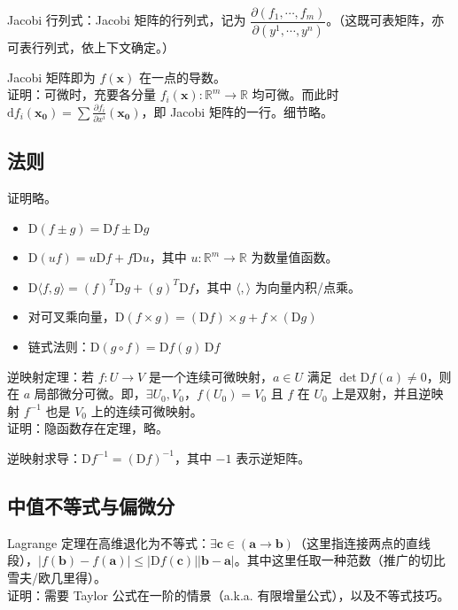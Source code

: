 \documentclass[12pt, a4paper, UTF8, openany]{ctexbook}
\newcommand{\dif}{\mathrm{d}}
\newcommand{\Dif}{\mathrm{D}}
\newcommand{\field}[1]{\mathbb{#1}}%
\newcommand{\mat}[1]{\mathbf{#1}}
\newcommand{\inner}[2]{\langle #1, #2 \rangle}
\begin{document}
        Jacobi 行列式：Jacobi 矩阵的行列式，记为 $\dfrac{\partial (f_1, \cdots, f_m)}{\partial (y^1, \cdots, y^n)}$。（这既可表矩阵，亦可表行列式，依上下文确定。）

        Jacobi 矩阵即为 $f(\mat{x})$ 在一点的导数。\\
        证明：可微时，充要各分量 $f_i(\mat{x}): \field{R}^m \to \field{R}$ 均可微。而此时 $\dif f_i(\mat{x_0}) = \sum \frac{\partial f_i}{\partial x^i}(\mat{x_0})$，即 Jacobi 矩阵的一行。细节略。

        \subsection{法则}
        证明略。
        \begin{itemize}
            \item $\Dif (f \pm g) = \Dif f \pm \Dif g$
            \item $\Dif (u f) = u \Dif f + f\Dif u$，其中 $u: \field{R}^m \to \field{R}$ 为数量值函数。
            \item $\Dif \inner{f}{g} = (f)^T\Dif g + (g)^T\Dif f$，其中 $\inner{}{}$ 为向量内积/点乘。
            \item 对可叉乘向量，$\Dif (f \times g) = (\Dif f) \times g + f \times (\Dif g)$
            \item 链式法则：$\Dif (g \circ f) = \Dif f(g) \,\Dif f$
        \end{itemize}

        逆映射定理：若 $f: U \to V$ 是一个连续可微映射，$a \in U$ 满足 $\det \Dif f(a) \neq 0$，则在 $a$ 局部微分可微。即，$\exists U_0, V_0$，$f(U_0) = V_0$ 且 $f$ 在 $U_0$ 上是双射，并且逆映射 $f^{-1}$ 也是 $V_0$ 上的连续可微映射。\\
        证明：隐函数存在定理，略。

        逆映射求导：$\Dif f^{-1} = (\Dif f)^{-1}$，其中 $-1$ 表示逆矩阵。

        \subsection{中值不等式与偏微分}
        Lagrange 定理在高维退化为不等式：$\exists \mat{c} \in (\mat{a} \to \mat{b})$（这里指连接两点的直线段），$|f(\mat{b}) - f(\mat{a})| \leqslant |\Dif f(\mat{c})||\mat{b} - \mat{a}|$。其中这里任取一种范数（推广的切比雪夫/欧几里得）。\\
        证明：需要 Taylor 公式在一阶的情景（a.k.a. 有限增量公式），以及不等式技巧。
\end{document}
